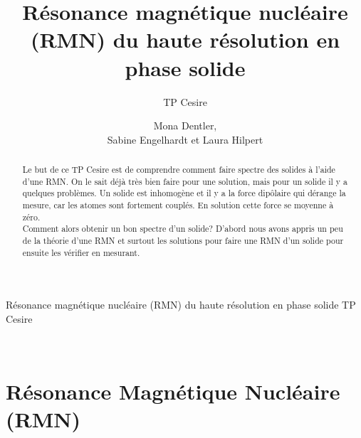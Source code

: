 \documentclass[a4paper,12pt]{scrartcl}
\title{Résonance magnétique nucléaire (RMN) du \isotope[13]{C} haute résolution en phase solide}
\subtitle{TP Cesire}
\author{Mona Dentler,\\ Sabine Engelhardt et Laura Hilpert}
\begin{document}
 \pagestyle{empty}
 \begin{center}
  \makeatletter
  \@subject
  \vspace{2cm}

  \Huge
  Résonance magnétique nucléaire (RMN) du  haute résolution en phase solide\newline
  \Large TP Cesire
  \vspace{1cm}

  \@author
  \newline\empty\\
  \@publishers


  \@date
  \makeatother
 \end{center}
 \vfill

 \begin{abstract}
  Le but de ce TP Cesire est de comprendre comment faire spectre des solides à l'aide d'une RMN. On le sait déjà très bien faire pour une solution, mais pour un solide il y a quelques problèmes. Un solide est inhomogène et il y a la force dipôlaire qui dérange la mesure, car les atomes sont fortement couplés. En solution cette force se moyenne à zéro.\\ 
  Comment alors obtenir un bon spectre d'un solide? D'abord nous avons appris un peu de la théorie d'une RMN et surtout les solutions pour faire une RMN d'un solide pour ensuite les vérifier en mesurant. 
 \end{abstract}
 \newpage
\pagestyle{scrheadings}
 \tableofcontents

 \section{Résonance Magnétique Nucléaire (RMN)}
\end{document}
